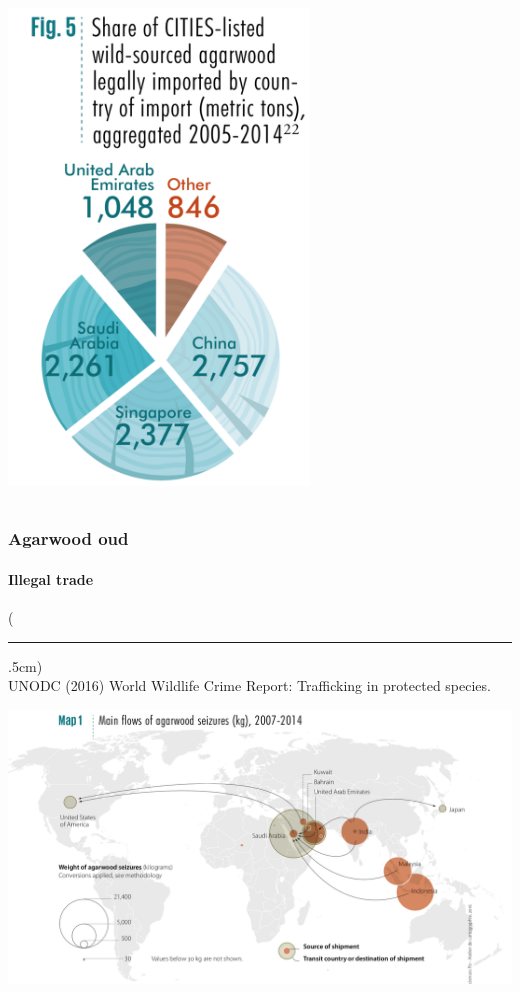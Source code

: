 \documentclass[10pt]{beamer}
\newenvironment{reference}[2]{%
	\begin{textblock*}{\textwidth}(#1,#2)
		\tiny\bgroup\color{gray}}{\egroup\end{textblock*}}
\begin{document}
\begin{frame}[t]
\begin{columns}
		\begin{column}{0.5\textwidth}
			\begin{center}
				\includegraphics[width=0.6\textwidth]{figures/agarwood_legal_import.png}
			\end{center}
		\end{column}
	\end{columns}
\end{frame}


\begin{frame}[t]
\frametitle{Agarwood oud}
\framesubtitle{Illegal trade}
\vspace{0.5cm}

	\begin{reference}{4mm}{92mm}
		\rule{1.5cm}{0.25pt}\\
		UNODC (2016) World Wildlife Crime Report: Trafficking in protected species.
	\end{reference}
	
	\vspace{0.25cm}
	
	\begin{center}
		\includegraphics[width=1.0\textwidth]{figures/map4b.png}
	\end{center}	
\end{frame}
\end{document}
